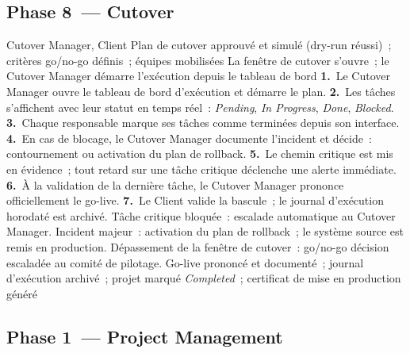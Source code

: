 \subsection*{Phase 8~--- Cutover}

  {Cutover Manager, Client}
  {Plan de cutover approuvé et simulé (dry-run réussi)~; critères go/no-go définis~; équipes mobilisées}
  {La fenêtre de cutover s'ouvre~; le Cutover Manager démarre l'exécution depuis le tableau de bord}
  {\textbf{1.}~Le Cutover Manager ouvre le tableau de bord d'exécution et démarre le plan.\newline
   \textbf{2.}~Les tâches s'affichent avec leur statut en temps réel~: \textit{Pending}, \textit{In Progress}, \textit{Done}, \textit{Blocked}.\newline
   \textbf{3.}~Chaque responsable marque ses tâches comme terminées depuis son interface.\newline
   \textbf{4.}~En cas de blocage, le Cutover Manager documente l'incident et décide~: contournement ou activation du plan de rollback.\newline
   \textbf{5.}~Le chemin critique est mis en évidence~; tout retard sur une tâche critique déclenche une alerte immédiate.\newline
   \textbf{6.}~À la validation de la dernière tâche, le Cutover Manager prononce officiellement le go-live.\newline
   \textbf{7.}~Le Client valide la bascule~; le journal d'exécution horodaté est archivé.}
  {Tâche critique bloquée~: escalade automatique au Cutover Manager. Incident majeur~: activation du plan de rollback~; le système source est remis en production. Dépassement de la fenêtre de cutover~: go/no-go décision escaladée au comité de pilotage.}
  {Go-live prononcé et documenté~; journal d'exécution archivé~; projet marqué \textit{Completed}~; certificat de mise en production généré}


\subsection*{Phase 1~--- Project Management}

